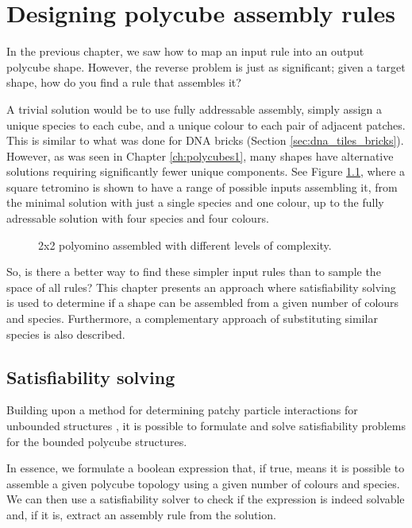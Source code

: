 \chapter{\label{ch:polycubes2}Designing polycube assembly rules}

\minitoc

In the previous chapter, we saw how to map an input rule into an output polycube shape. However, the reverse problem is just as significant; given a target shape, how do you find a rule that assembles it?  


A trivial solution would be to use fully addressable assembly, simply assign a unique species to each cube, and a unique colour to each pair of adjacent patches. This is similar to what was done for DNA bricks (Section \ref{sec:dna_tiles_bricks}). However, as was seen in Chapter \ref{ch:polycubes1}, many shapes have alternative solutions requiring significantly fewer unique components. See Figure \ref{fig:addressable}, where a square tetromino is shown to have a range of possible inputs assembling it, from the minimal solution with just a single species and one colour, up to the fully adressable solution with four species and four colours.

\begin{figure}[h]
    \centering
    \caption{2x2 polyomino assembled with different levels of complexity.}
    \label{fig:addressable}
\end{figure}

So, is there a better way to find these simpler input rules than to sample the space of all rules? This chapter presents an approach where satisfiability solving is used to determine if a shape can be assembled from a given number of colours and species. Furthermore, a complementary approach of substituting similar species is also described.


\section{Satisfiability solving}

Building upon a method for determining patchy particle interactions for unbounded structures \cite{romano2020designing}, it is possible to formulate and solve satisfiability problems for the bounded polycube structures.

In essence, we formulate a boolean expression that, if true, means it is possible to assemble a given polycube topology using a given number of colours and species. We can then use a satisfiability solver to check if the expression is indeed solvable and, if it is, extract an assembly rule from the solution.


